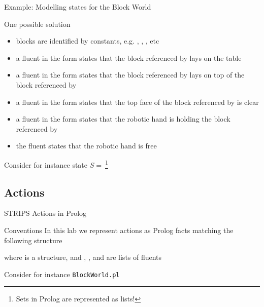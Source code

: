 \documentclass[presentation]{beamer}\mode<presentation>{\usetheme{AMSBolognaFC}}
\begin{document}
\begin{frame}[allowframebreaks]{Example: Modelling states for the Block World}

One possible solution
%
\begin{itemize}
	\item blocks are identified by constants, e.g. , , , etc
	\vfill
	\item a fluent in the form  states that the block referenced by  lays on the table
	\vfill
	\item a fluent in the form  states that the block referenced by  lays on top of the block referenced by 
	\vfill
	\item a fluent in the form  states that the top face of the block referenced by  is clear
	\vfill
	\item a fluent in the form  states that the robotic hand is holding the block referenced by 
	\vfill
	\item the fluent  states that the robotic hand is free
\end{itemize}

\framebreak

Consider for instance state $S =\ $\footnote{Sets in Prolog are represented as lists!}
%
\begin{center}

\end{center}

\end{frame}

\subsection{Actions}

\begin{frame}[c]{STRIPS Actions in Prolog}

\begin{block}{Conventions}
	In this lab we represent actions as Prolog facts matching the following structure
	\begin{center}
	\end{center}
	where  is a structure, and , , and  are lists of fluents

\end{block}

\begin{exampleblock}{Consider for instance \texttt{BlockWorld.pl}}
	
\end{exampleblock}

\end{frame}
\end{document}
